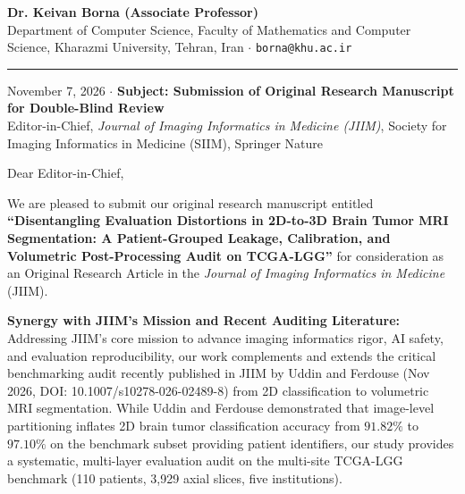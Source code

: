 \documentclass[10pt,a4paper]{article}
\begin{document}
\thispagestyle{empty}
\enlargethispage{7.5\baselineskip}
\footnotesize

\noindent\textbf{Dr. Keivan Borna (Associate Professor)} \\
Department of Computer Science, Faculty of Mathematics and Computer Science, Kharazmi University, Tehran, Iran \quad $\cdot$ \quad \texttt{borna@khu.ac.ir} \\
\rule{\textwidth}{0.5pt}

\vspace{0.04em}
\noindent November 7, 2026 \quad $\cdot$ \quad \textbf{Subject: Submission of Original Research Manuscript for Double-Blind Review} \\[0.10em]
\noindent Editor-in-Chief, \textit{Journal of Imaging Informatics in Medicine (JIIM)}, Society for Imaging Informatics in Medicine (SIIM), Springer Nature

\vspace{0.04em}
\noindent Dear Editor-in-Chief,

\vspace{0.05em}
We are pleased to submit our original research manuscript entitled \textbf{``Disentangling \mbox{Evaluation} Distortions in 2D-to-3D Brain Tumor MRI Segmentation: A Patient-Grouped Leakage, Calibration, and Volumetric Post-Processing Audit on TCGA-LGG''} for consideration as an Original Research Article in the \textit{Journal of Imaging Informatics in Medicine} (JIIM).

\vspace{0.04em}
\noindent\textbf{Synergy with JIIM's Mission and Recent Auditing Literature:}
Addressing JIIM's core mission to advance imaging informatics rigor, AI safety, and evaluation reproducibility, our work complements and extends the critical benchmarking audit recently published in JIIM by Uddin and Ferdouse (Nov 2026, DOI: 10.1007/s10278-026-02489-8) from 2D classification to volumetric MRI segmentation. While Uddin and Ferdouse demonstrated that image-level partitioning inflates 2D brain tumor classification accuracy from $91.82\%$ to $97.10\%$ on the benchmark subset providing patient identifiers, our study provides a systematic, multi-layer evaluation audit on the multi-site TCGA-LGG benchmark (110 patients, 3,929 axial slices, five institutions).
\end{document}

